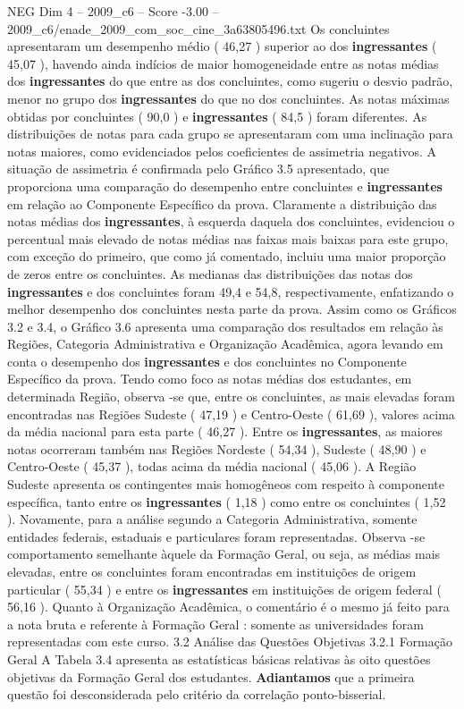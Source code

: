 \begin{textsample}{NEG Dim 4 – 2009\_c6 – Score -3.00 – 2009\_c6/enade\_2009\_com\_soc\_cine\_3a63805496.txt}
Os concluintes apresentaram um desempenho médio ( 46,27 ) superior ao dos \textbf{ingressantes} ( 45,07 ), havendo ainda indícios de maior homogeneidade entre as notas médias dos \textbf{ingressantes} do que entre as dos concluintes, como sugeriu o desvio padrão, menor no grupo dos \textbf{ingressantes} do que no dos concluintes.
As notas máximas obtidas por concluintes ( 90,0 ) e \textbf{ingressantes} ( 84,5 ) foram diferentes.
As distribuições de notas para cada grupo se apresentaram com uma inclinação para notas maiores, como evidenciados pelos coeficientes de assimetria negativos.
A situação de assimetria é confirmada pelo Gráfico 3.5 apresentado, que proporciona uma comparação do desempenho entre concluintes e \textbf{ingressantes} em relação ao Componente Específico da prova.
Claramente a distribuição das notas médias dos \textbf{ingressantes}, à esquerda daquela dos concluintes, evidenciou o percentual mais elevado de notas médias nas faixas mais baixas para este grupo, com exceção do primeiro, que como já comentado, incluiu uma maior proporção de zeros entre os concluintes.
As medianas das distribuições das notas dos \textbf{ingressantes} e dos concluintes foram 49,4 e 54,8, respectivamente, enfatizando o melhor desempenho dos concluintes nesta parte da prova.
Assim como os Gráficos 3.2 e 3.4, o Gráfico 3.6 apresenta uma comparação dos resultados em relação às Regiões, Categoria Administrativa e Organização Acadêmica, agora levando em conta o desempenho dos \textbf{ingressantes} e dos concluintes no Componente Específico da prova.
Tendo como foco as notas médias dos estudantes, em determinada Região, observa -se que, entre os concluintes, as mais elevadas foram encontradas nas Regiões Sudeste ( 47,19 ) e Centro-Oeste ( 61,69 ), valores acima da média nacional para esta parte ( 46,27 ).
Entre os \textbf{ingressantes}, as maiores notas ocorreram também nas Regiões Nordeste ( 54,34 ), Sudeste ( 48,90 ) e Centro-Oeste ( 45,37 ), todas acima da média nacional ( 45,06 ).
A Região Sudeste apresenta os contingentes mais homogêneos com respeito à componente específica, tanto entre os \textbf{ingressantes} ( 1,18 ) como entre os concluintes ( 1,52 ).
Novamente, para a análise segundo a Categoria Administrativa, somente entidades federais, estaduais e particulares foram representadas.
Observa -se comportamento semelhante àquele da Formação Geral, ou seja, as médias mais elevadas, entre os concluintes foram encontradas em instituições de origem particular ( 55,34 ) e entre os \textbf{ingressantes} em instituições de origem federal ( 56,16 ).
Quanto à Organização Acadêmica, o comentário é o mesmo já feito para a nota bruta e referente à Formação Geral : somente as universidades foram representadas com este curso. 3.2 Análise das Questões Objetivas 3.2.1 Formação Geral A Tabela 3.4 apresenta as estatísticas básicas relativas às oito questões objetivas da Formação Geral dos estudantes. \textbf{Adiantamos} que a primeira questão foi desconsiderada pelo critério da correlação ponto-bisserial.

\end{textsample}
